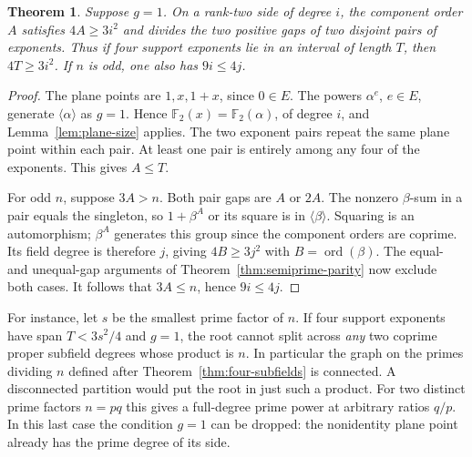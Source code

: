 \documentclass[11pt]{article}
\newtheorem{theorem}{Theorem}
\newcommand{\ord}{\operatorname{ord}}
\begin{document}
\begin{theorem}\label{thm:four-cluster}
Suppose \(g=1\). On a rank-two side of degree \(i\), the component
order \(A\) satisfies \(4A\ge3i^2\) and divides the two positive
gaps of two disjoint pairs of exponents. Thus if four support
exponents lie in an interval of length \(T\), then \(4T\ge3i^2\).
If \(n\) is odd, one also has \(9i\le4j\).
\end{theorem}
\begin{proof}
The plane points are \(1,x,1+x\), since \(0\in E\).
The powers \(\alpha^e\), \(e\in E\), generate \(\langle\alpha\rangle\)
as \(g=1\). Hence \(\mathbb F_2(x)=\mathbb F_2(\alpha)\), of degree
\(i\), and Lemma~\ref{lem:plane-size} applies. The two exponent pairs
repeat the same plane point within each pair. At least one pair is
entirely among any four of the exponents. This gives \(A\le T\).

For odd \(n\), suppose \(3A>n\). Both pair gaps are \(A\) or \(2A\).
The nonzero \(\beta\)-sum in a pair equals the singleton, so
\(1+\beta^A\) or its square is in \(\langle\beta\rangle\).
Squaring is an automorphism; \(\beta^A\) generates this group since
the component orders are coprime. Its field degree is therefore
\(j\), giving \(4B\ge3j^2\) with \(B=\ord(\beta)\). The equal- and
unequal-gap arguments of Theorem~\ref{thm:semiprime-parity} now
exclude both cases. It follows that \(3A\le n\), hence \(9i\le4j\).
\end{proof}

For instance, let \(s\) be the smallest prime factor of \(n\).
If four support exponents have span \(T<3s^2/4\) and \(g=1\),
the root cannot split across \emph{any} two coprime proper subfield
degrees whose product is \(n\). In particular the graph on the
primes dividing \(n\) defined after Theorem~\ref{thm:four-subfields}
is connected. A disconnected partition would put the root in just
such a product. For two distinct prime factors \(n=pq\) this gives a
full-degree prime power at arbitrary ratios \(q/p\). In this last
case the condition \(g=1\) can be dropped: the nonidentity plane
point already has the prime degree of its side.
\end{document}
